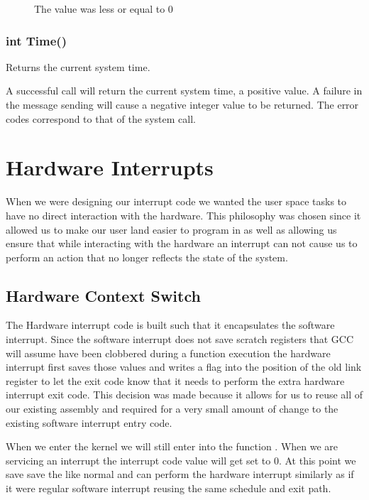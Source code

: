 \documentclass[pdftex,10pt,a4paper]{article}
\begin{document}
\begin{description}
\item[] The  value was less or
  equal to $0$
\end{description}


\subsubsection*{int Time()}

Returns the current system time.

A successful call will return the current system time, a positive
value. A failure in the message sending will cause a negative integer
value to be returned. The error codes correspond to that of the
 system call.


\section*{Hardware Interrupts}

When we were designing our interrupt code we wanted the user space tasks to
have no direct interaction with the hardware. This philosophy was chosen since
it allowed us to make our user land easier to program in as well as allowing us
ensure that while interacting with the hardware an interrupt can not cause us
to perform an action that no longer reflects the state of the system.

\subsection*{Hardware Context Switch}

The Hardware interrupt code is built such that it encapsulates the software
interrupt. Since the software interrupt does not save scratch registers that
GCC will assume have been clobbered during a function execution the hardware
interrupt first saves those values and writes a flag into the position of the
old link register to let the exit code know that it needs to perform the extra
hardware interrupt exit code. This decision was made because it allows for us
to reuse all of our existing assembly and required for a very small amount of
change to the existing software interrupt entry code.

When we enter the kernel we will still enter into the function
. When we are servicing an interrupt the interrupt code
value will get set to 0. At this point we save save the  like normal
and can perform the hardware interrupt similarly as if it were regular software
interrupt reusing the same schedule and exit path.
\end{document}
